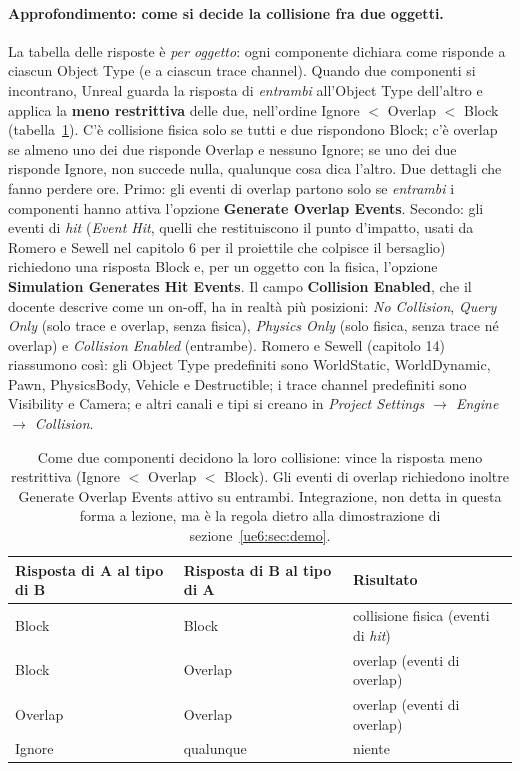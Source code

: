 \paragraph{Approfondimento: come si decide la collisione fra due oggetti.} La tabella
delle risposte è \emph{per oggetto}: ogni componente dichiara come risponde a ciascun
Object Type (e a ciascun trace channel). Quando due componenti si incontrano, Unreal
guarda la risposta di \emph{entrambi} all'Object Type dell'altro e applica la
\textbf{meno restrittiva} delle due, nell'ordine Ignore $<$ Overlap $<$ Block
(tabella~\ref{ue6:tab:risposte}). C'è collisione fisica solo se tutti e due rispondono
Block; c'è overlap se almeno uno dei due risponde Overlap e nessuno Ignore; se uno dei
due risponde Ignore, non succede nulla, qualunque cosa dica l'altro. Due dettagli che
fanno perdere ore. Primo: gli eventi di overlap partono solo se \emph{entrambi} i
componenti hanno attiva l'opzione \textbf{Generate Overlap Events}. Secondo: gli eventi
di \emph{hit} (\emph{Event Hit}, quelli che restituiscono il punto d'impatto, usati da
Romero e Sewell nel capitolo 6 per il proiettile che colpisce il bersaglio) richiedono
una risposta Block e, per un oggetto con la fisica, l'opzione \textbf{Simulation
Generates Hit Events}. Il campo \textbf{Collision Enabled}, che il docente descrive come
un on-off, ha in realtà più posizioni: \emph{No Collision}, \emph{Query Only} (solo
trace e overlap, senza fisica), \emph{Physics Only} (solo fisica, senza trace né overlap)
e \emph{Collision Enabled} (entrambe). Romero e Sewell (capitolo 14) riassumono così:
gli Object Type predefiniti sono WorldStatic, WorldDynamic, Pawn, PhysicsBody, Vehicle e
Destructible; i trace channel predefiniti sono Visibility e Camera; e altri canali e tipi
si creano in \emph{Project Settings $\rightarrow$ Engine $\rightarrow$ Collision}.

\begin{table}[htbp]
\centering
\small
\begin{tabular}{@{}lll@{}}
\toprule
\textbf{Risposta di A al tipo di B} & \textbf{Risposta di B al tipo di A} &
\textbf{Risultato} \\
\midrule
Block   & Block   & collisione fisica (eventi di \emph{hit}) \\
Block   & Overlap & overlap (eventi di overlap) \\
Overlap & Overlap & overlap (eventi di overlap) \\
Ignore  & qualunque & niente \\
\bottomrule
\end{tabular}
\caption{Come due componenti decidono la loro collisione: vince la risposta meno
restrittiva (Ignore $<$ Overlap $<$ Block). Gli eventi di overlap richiedono inoltre
Generate Overlap Events attivo su entrambi. Integrazione, non detta in questa forma a
lezione, ma è la regola dietro alla dimostrazione di sezione~\ref{ue6:sec:demo}.}
\label{ue6:tab:risposte}
\end{table}

